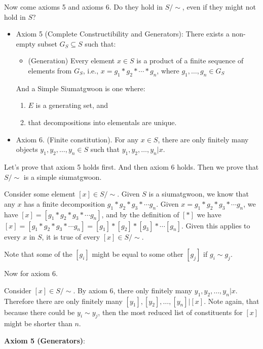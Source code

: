 Now come axioms 5 and axioms 6. Do they hold in $S/\sim$, even if they might not hold in $S$?

\begin{itemize}
\item Axiom 5 (Complete Constructibility and Generators): There exists a non-empty subset $G_{S} \subseteq S$ such that:
    \begin{itemize}
    \item (Generation) Every element $x \in S$ is a product of a finite sequence of elements from $G_S$, i.e., $x = g_1 * g_2 * \cdots * g_n$, where $g_1, \dots, g_n \in G_S$
    \end{itemize}

And a Simple Siumatgwoon is one where:

\begin{enumerate}
\item $E$ is a generating set, and 
\item that decompositions into elementals are unique.
\end{enumerate}

\item Axiom 6. (Finite constitution). For any $x \in S$, there are only finitely many objects $y_1, y_2, \ldots, y_n \in S$ such that $y_1, y_2, \ldots, y_n | x$.
\end{itemize}

Let's prove that axiom 5 holds first. And then axiom 6 holds. Then we prove that $S/\sim$ is a simple siumatgwoon.

Consider some element $[x] \in S/\sim$. Given $S$ is a siumatgwoon, we know that any $x$ has a finite decomposition $g_1 * g_2 * g_3 * \cdots g_n$. Given $x=g_1 * g_2 * g_3 * \cdots g_n$, we have $[x]=[g_1 * g_2 * g_3 * \cdots g_n]$, and by the definition of $[*]$ we have $[x]=[g_1 * g_2 * g_3 * \cdots g_n]=[g_1] * [g_2] * [g_3] * \cdots [g_n]$. Given this applies to every $x$ in $S$, it is true of every $[x]\in S/\sim$. 

Note that some of the $[g_i]$ might be equal to some other $[g_j]$ if $g_i \sim g_j$.

Now for axiom 6.

Consider $[x]\in S/\sim$. By axiom 6, there only finitely many $y_1, y_2, \ldots, y_n | x.$ Therefore there are only finitely many $[y_1], [y_2], \ldots, [y_n] | [x].$ Note again, that because there could be $y_i \sim y_j$, then the most reduced list of constituents for $[x]$ might be shorter than $n$.

\textbf{Axiom 5 (Generators)}:

